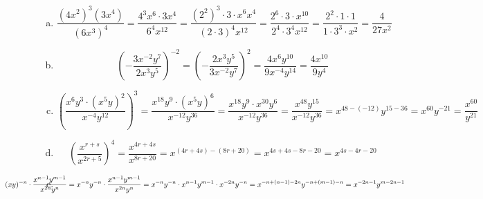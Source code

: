 \documentclass[11pt,letterpaper]{article}
\begin{document}
\sol 
\begin{enumerate}[(a)]
\item 
	\[
	\dfrac{(4x^2)^3 (3x^4)}{(6x^3)^4}= \dfrac{4^3 x^6 \cdot 3 x^4}{6^4 x^{12}}= \dfrac{(2^2)^3 \cdot 3 \cdot x^6 x^4}{(2 \cdot 3)^4 x^{12}}= \dfrac{2^6 \cdot 3 \cdot x^{10}}{2^4 \cdot 3^4 x^{12}}= \dfrac{2^2 \cdot 1 \cdot 1}{1 \cdot 3^3 \cdot x^2}= \dfrac{4}{27x^2}
	\] \pspace

\item 
	\[
	\left( - \dfrac{3x^{-2} y^7}{2x^3 y^5} \right)^{-2}= \left( - \dfrac{2x^3 y^5}{3x^{-2} y^7} \right)^2= \dfrac{4 x^6 y^{10}}{9 x^{-4} y^{14}}= \dfrac{4 x^{10}}{9y^4}
	\] \pspace

\item 
	\[
	\left( \dfrac{x^6 y^3 \cdot (x^5y)^2}{x^{-4} y^{12}} \right)^3= \dfrac{x^{18} y^9 \cdot (x^5y)^6}{x^{-12} y^{36}}= \dfrac{x^{18} y^9 \cdot x^{30} y^6}{x^{-12} y^{36}}= \dfrac{x^{48} y^{15}}{x^{-12} y^{36}}= x^{48 - (-12)} y^{15 - 36}= x^{60} y^{-21}= \dfrac{x^{60}}{y^{21}}
	\] \pspace

\item 
	\[
	\left( \dfrac{x^{r + s}}{x^{2r + 5}} \right)^4= \dfrac{x^{4r + 4s}}{x^{8r + 20}}= x^{(4r + 4s) - (8r + 20)}= x^{4s + 4s - 8r - 20}= x^{4s - 4r - 20}
	\] \pspace

\item 
	\[
	\hspace{-2.5cm} (xy)^{-n} \cdot \dfrac{x^{n - 1} y^{m - 1}}{x^{2n} y^n}= x^{-n} y^{-n} \cdot \dfrac{x^{n - 1} y^{m - 1}}{x^{2n} y^n}= x^{-n} y^{-n} \cdot x^{n-1} y^{m-1} \cdot x^{-2n} y^{-n}= x^{-n + (n-1) - 2n} y^{-n + (m-1) - n}= x^{-2n - 1} y^{m - 2n - 1}
	\]
\end{enumerate}
\end{document}
